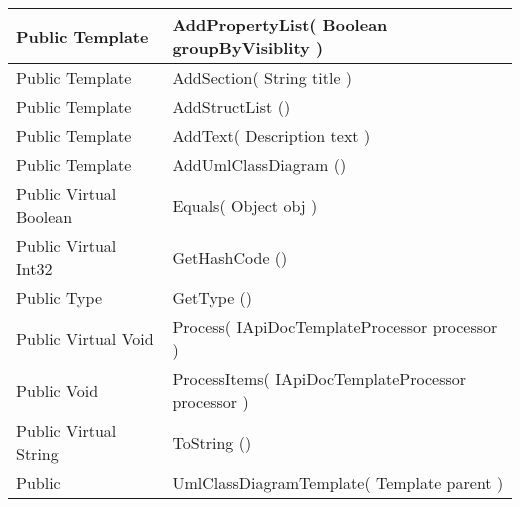 \documentclass[11pt, oneside, a4paper]{book}
\begin{document}
\begin{center}
\begin{tabular}{| p{3cm} | p{12cm} | }
\hline
 Public  Template &  AddPropertyList(\hypertarget{SoftwareEngineeringTools.{}Documentation.{}UmlClassDiagramTemplate.{}AddPropertyList\_Boolean}{} Boolean  groupByVisiblity  )\\
\hline
 Public  Template &  AddSection(\hypertarget{SoftwareEngineeringTools.{}Documentation.{}UmlClassDiagramTemplate.{}AddSection\_String}{} String  title  )\\
\hline
 Public  Template &  AddStructList ()\hypertarget{SoftwareEngineeringTools.{}Documentation.{}UmlClassDiagramTemplate.{}AddStructList}{}\\
\hline
 Public  Template &  AddText(\hypertarget{SoftwareEngineeringTools.{}Documentation.{}UmlClassDiagramTemplate.{}AddText\_Description}{} Description  text  )\\
\hline
 Public  Template &  AddUmlClassDiagram ()\hypertarget{SoftwareEngineeringTools.{}Documentation.{}UmlClassDiagramTemplate.{}AddUmlClassDiagram}{}\\
\hline
 Public  Virtual  Boolean &  Equals(\hypertarget{SoftwareEngineeringTools.{}Documentation.{}UmlClassDiagramTemplate.{}Equals\_Object}{} Object  obj  )\\
\hline
 Public  Virtual  Int32 &  GetHashCode ()\hypertarget{SoftwareEngineeringTools.{}Documentation.{}UmlClassDiagramTemplate.{}GetHashCode}{}\\
\hline
 Public  Type &  GetType ()\hypertarget{SoftwareEngineeringTools.{}Documentation.{}UmlClassDiagramTemplate.{}GetType}{}\\
\hline
 Public  Virtual  Void &  Process(\hypertarget{SoftwareEngineeringTools.{}Documentation.{}UmlClassDiagramTemplate.{}Process\_IApiDocTemplateProcessor}{} IApiDocTemplateProcessor  processor  )\\
\hline
 Public  Void &  ProcessItems(\hypertarget{SoftwareEngineeringTools.{}Documentation.{}UmlClassDiagramTemplate.{}ProcessItems\_IApiDocTemplateProcessor}{} IApiDocTemplateProcessor  processor  )\\
\hline
 Public  Virtual  String &  ToString ()\hypertarget{SoftwareEngineeringTools.{}Documentation.{}UmlClassDiagramTemplate.{}ToString}{}\\
\hline
 Public  &  UmlClassDiagramTemplate(\hypertarget{SoftwareEngineeringTools.{}Documentation.{}UmlClassDiagramTemplate.{}UmlClassDiagramTemplate\_Template}{} Template  parent  )\\
\hline
\end{tabular}
\end{center}
 
\end{document}
